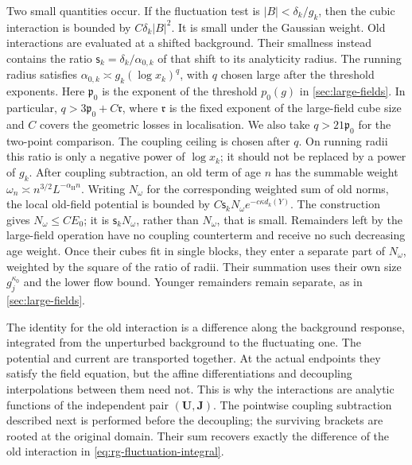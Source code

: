 \documentclass[11pt,letterpaper,reqno]{amsart}
\theoremstyle{definition}
\theoremstyle{remark}
\begin{document}
Two small quantities occur. If the fluctuation test is
$|B|<\delta_k/g_k$, then the cubic interaction is bounded by
$C\delta_k|B|^2$. It is small under the Gaussian weight. Old
interactions are evaluated at a shifted background. Their smallness
instead contains the ratio
$\mathsf s_k=\delta_k/\alpha_{0,k}$ of that shift to its
analyticity radius. The running radius satisfies
$\alpha_{0,k}\asymp g_k(\log x_k)^q$, with $q$ chosen large
after the threshold exponents. Here $\mathfrak p_0$ is the exponent
of the threshold $p_0(g)$ in \cref{sec:large-fields}. In particular,
$q>3\mathfrak p_0+C\mathfrak r$, where $\mathfrak r$ is the
fixed exponent of the large-field cube size and $C$ covers the
geometric losses in localisation. We also take $q>21\mathfrak p_0$
for the two-point comparison. The coupling ceiling is chosen
after $q$. On running radii this ratio is only a negative
power of $\log x_k$; it should not be replaced by a power of $g_k$.
After coupling subtraction, an old term of age $n$ has the summable
weight
$\omega_n\asymp n^{3/2}L^{-\alpha_{\mathrm H}n}$.
Writing $N_\omega$ for the corresponding weighted sum of old norms,
the local old-field potential is bounded by
$C\mathsf s_kN_\omega e^{-c\kappa d_k(Y)}$.
The construction gives $N_\omega\le CE_0$; it is
$\mathsf s_kN_\omega$, rather than $N_\omega$, that is small.
Remainders left by the large-field operation have no coupling
counterterm and receive no such decreasing age weight. Once their
cubes fit in single blocks, they enter a separate part of
$N_\omega$, weighted by the square of the ratio of radii. Their
summation uses their own size $g_j^{\kappa_0}$ and the lower
flow bound. Younger remainders remain separate, as in
\cref{sec:large-fields}.

The identity for the old interaction is a difference along the
background response, integrated from the unperturbed background to
the fluctuating one. The potential and current are transported
together. At the actual endpoints they satisfy the field equation,
but the affine differentiations and decoupling interpolations between
them need not. This is why the interactions are analytic functions of
the independent pair $(\mathbf U,\mathbf J)$.
The pointwise coupling subtraction described next is performed before
the decoupling; the surviving brackets are rooted at the original
domain. Their sum recovers exactly the difference of the old
interaction in \eqref{eq:rg-fluctuation-integral}.
\end{document}
